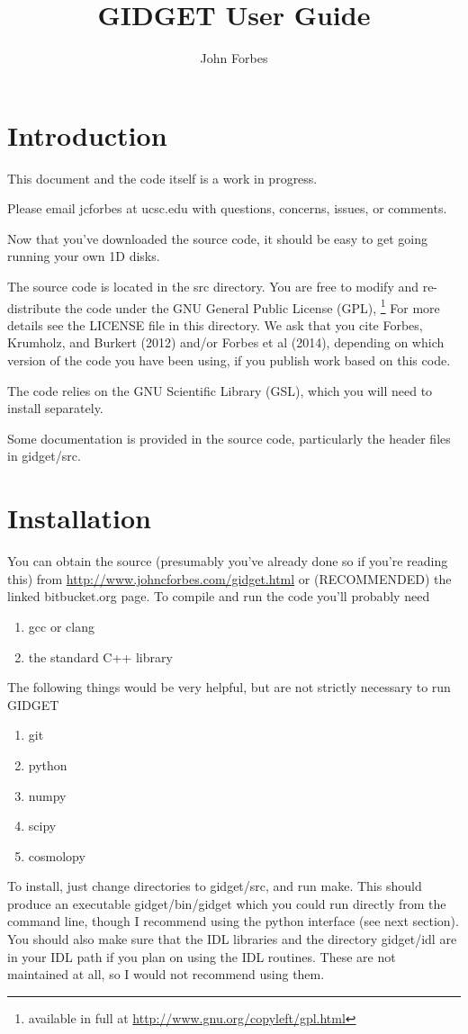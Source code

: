 \documentclass[11pt]{amsart}
\title{GIDGET User Guide}
\author{John Forbes}
\begin{document}
\maketitle

\section{Introduction}
This document and the code itself is a work in progress.

Please email jcforbes at ucsc.edu with questions, concerns, issues, or comments.

Now that you've downloaded the source code, it should be easy to get going running your own 1D disks.

The source code is located in the src directory. You are free to modify and re-distribute the code under the GNU General Public License (GPL), \footnote{available in full at \url{http://www.gnu.org/copyleft/gpl.html}} For more details see the LICENSE file in this directory. We ask that you cite Forbes, Krumholz, and Burkert (2012) and/or Forbes et al (2014), depending on which version of the code you have been using, if you publish work based on this code.

The code relies on the GNU Scientific Library (GSL), which you will need to install separately.

Some documentation is provided in the source code, particularly the header files in gidget/src. 


\section{Installation}

You can obtain the source (presumably you've already done so if you're reading this) from \url{http://www.johncforbes.com/gidget.html} or (RECOMMENDED) the linked bitbucket.org page. To compile and run the code you'll probably need
\begin{enumerate}
\item gcc or clang
\item the standard C++ library
\end{enumerate}
The following things would be very helpful, but are not strictly necessary to run GIDGET
\begin{enumerate}
\item git
\item python
\item numpy
\item scipy
\item cosmolopy
\end{enumerate}
To install, just change directories to gidget/src, and run make. This should produce an executable gidget/bin/gidget which you could run directly from the command line, though I recommend using the python interface (see next section). You should also make sure that the IDL libraries and the directory gidget/idl are in your IDL path if you plan on using the IDL routines. These are not maintained at all, so I would not recommend using them.
\end{document}
